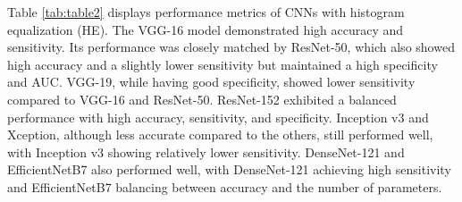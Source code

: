 \documentclass{article}
\begin{document}
\begin{table}
    \caption{Performance Metrics of Convolutional Neural Network Models with Histogram Equalization}
    \label{tab:table2}
\end{table}

Table \ref{tab:table2} displays performance metrics of CNNs with histogram equalization (HE). The VGG-16 model demonstrated high accuracy and sensitivity. Its performance was closely matched by ResNet-50, which also showed high accuracy and a slightly lower sensitivity but maintained a high specificity and AUC. VGG-19, while having good specificity, showed lower sensitivity compared to VGG-16 and ResNet-50. ResNet-152 exhibited a balanced performance with high accuracy, sensitivity, and specificity. Inception v3 and Xception, although less accurate compared to the others, still performed well, with Inception v3 showing relatively lower sensitivity. DenseNet-121 and EfficientNetB7 also performed well, with DenseNet-121 achieving high sensitivity and EfficientNetB7 balancing between accuracy and the number of parameters.
\end{document}
